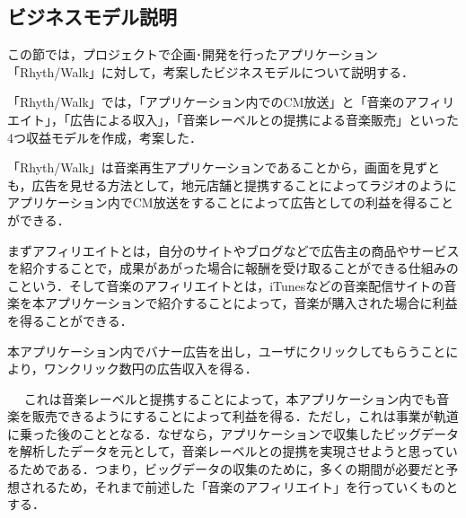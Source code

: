 \subsection{ビジネスモデル説明}
\par
\begin{itemize}
この節では，プロジェクトで企画･開発を行ったアプリケーション「Rhyth/Walk」に対して，考案したビジネスモデルについて説明する．
\par
「Rhyth/Walk」では，「アプリケーション内でのCM放送」と「音楽のアフィリエイト」，「広告による収入」，「音楽レーベルとの提携による音楽販売」といった4つ収益モデルを作成，考案した．
\par
{}
「Rhyth/Walk」は音楽再生アプリケーションであることから，画面を見ずとも，広告を見せる方法として，地元店舗と提携することによってラジオのようにアプリケーション内でCM放送をすることによって広告としての利益を得ることができる．
\par
{}
まずアフィリエイトとは，自分のサイトやブログなどで広告主の商品やサービスを紹介することで，成果があがった場合に報酬を受け取ることができる仕組みのこという．そして音楽のアフィリエイトとは，iTunesなどの音楽配信サイトの音楽を本アプリケーションで紹介することによって，音楽が購入された場合に利益を得ることができる．
\par
{}
本アプリケーション内でバナー広告を出し，ユーザにクリックしてもらうことにより，ワンクリック数円の広告収入を得る．
\par
{}　
これは音楽レーベルと提携することによって，本アプリケーション内でも音楽を販売できるようにすることによって利益を得る．ただし，これは事業が軌道に乗った後のこととなる．なぜなら，アプリケーションで収集したビッグデータを解析したデータを元として，音楽レーベルとの提携を実現させようと思っているためである．つまり，ビッグデータの収集のために，多くの期間が必要だと予想されるため，それまで前述した「音楽のアフィリエイト」を行っていくものとする．
\end{itemize}
